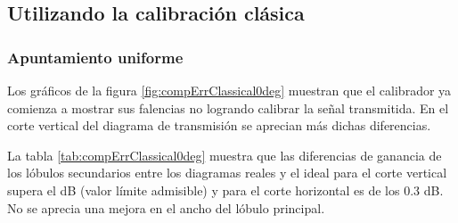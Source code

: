 \subsection{Utilizando la calibración clásica}

\subsubsection{Apuntamiento uniforme}

Los gráficos de la figura \ref{fig:compErrClassical0deg} muestran que el calibrador ya comienza a mostrar sus falencias no 
logrando calibrar la señal transmitida. En el corte vertical del diagrama de transmisión se aprecian más dichas diferencias.

La tabla \ref{tab:compErrClassical0deg} muestra que las diferencias de ganancia de los lóbulos secundarios entre los diagramas 
reales y el ideal para el corte vertical supera el dB (valor límite admisible) y para el corte horizontal es de los 0.3 dB. No 
se aprecia una mejora en el ancho del lóbulo principal.
